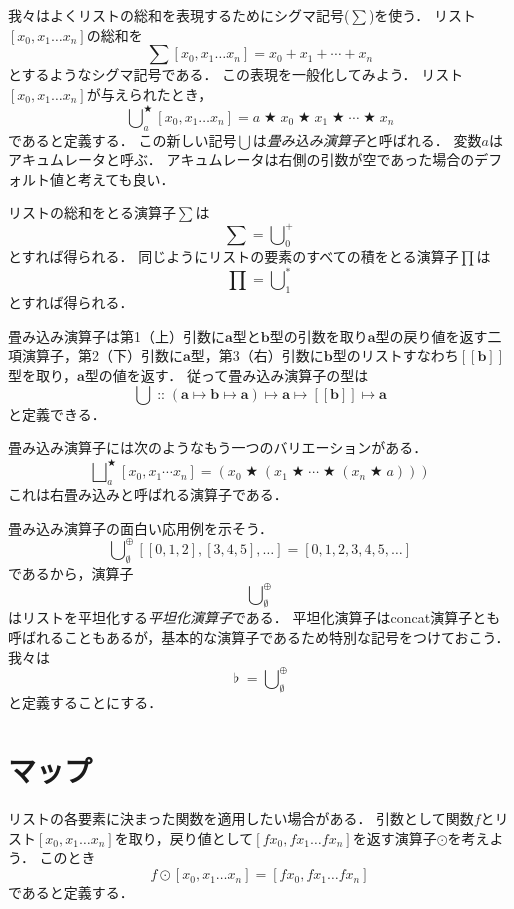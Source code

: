 \documentclass[twocolumn]{jsbook}
\def\[{[\![}
\def\]{]\!]}
\newcommand{\hsklType}[1]{\textbf{#1}}
\DeclareMathOperator{\hsklConcat}{\flat}
\newcommand{\hsklAppend}{\oplus}
\newcommand{\hsklEmptyList}{\emptyset}
\newcommand{\hsklMap}{\odot}
\newcommand{\hsklListType}[1]{\[#1\]}
\DeclareMathOperator{\mathAnyBinaryOperator}{\bigstar}
\DeclareMathOperator{\mathIn}{::}
\DeclareMathOperator*{\mathFold}{\bigcup}
\DeclareMathOperator*{\mathFoldRight}{\bigsqcup}
\DeclareMathOperator{\mathMapsTo}{\mapsto}
\newcommand{\mathMorphII}[3]{#1\mathMapsTo#2\mathMapsTo#3}
\newcommand{\mathMorphIII}[4]{#1\mathMapsTo#2\mathMapsTo#3\mathMapsTo#4}
\newcommand{\keyword}[1]{\emph{#1}}
\begin{document}
我々はよくリストの総和を表現するためにシグマ記号($\sum$)を使う．
リスト$[x_0,x_1\dots x_n]$の総和を$$\sum[x_0,x_1\dots x_n]=x_0+x_1+\dotsb+x_n$$とするようなシグマ記号である．
この表現を一般化してみよう．
リスト$[x_0,x_1\dots x_n]$が与えられたとき，$$\mathFold^{\mathAnyBinaryOperator}_{a}[x_0,x_1\dots x_n]=a\mathAnyBinaryOperator x_0\mathAnyBinaryOperator x_1\mathAnyBinaryOperator\dotsb\mathAnyBinaryOperator x_n$$であると定義する．
この新しい記号$\mathFold$は\keyword{畳み込み演算子}と呼ばれる．
変数$a$はアキュムレータと呼ぶ．
アキュムレータは右側の引数が空であった場合のデフォルト値と考えても良い．

リストの総和をとる演算子$\sum$は$$\sum=\mathFold^+_0$$とすれば得られる．
同じようにリストの要素のすべての積をとる演算子$\prod$は$$\prod=\mathFold^*_1$$とすれば得られる．

畳み込み演算子は第1（上）引数に$\hsklType{a}$型と$\hsklType{b}$型の引数を取り$\hsklType{a}$型の戻り値を返す二項演算子，第2（下）引数に$\hsklType{a}$型，第3（右）引数に$\hsklType{b}$型のリストすなわち$\hsklListType{\hsklType{b}}$型を取り，$\hsklType{a}$型の値を返す．
従って畳み込み演算子の型は$$\mathFold\mathIn\mathMorphIII{(\mathMorphII{\hsklType{a}}{\hsklType{b}}{\hsklType{a}})}{\hsklType{a}}{\hsklListType{\hsklType{b}}}{\hsklType{a}}$$と定義できる．

畳み込み演算子には次のようなもう一つのバリエーションがある．
$$\mathFoldRight^{\mathAnyBinaryOperator}_{a}[x_0,x_1\dotsb x_n]=\left(x_0\mathAnyBinaryOperator\left(x_1\mathAnyBinaryOperator\dotsb\mathAnyBinaryOperator\left(x_n\mathAnyBinaryOperator a\right)\right)\right)$$
これは右畳み込みと呼ばれる演算子である．

畳み込み演算子の面白い応用例を示そう．
$$\mathFold_\hsklEmptyList^\hsklAppend[[0,1,2],[3,4,5],\dots]=[0,1,2,3,4,5,\dots]$$
であるから，演算子$$\mathFold_\hsklEmptyList^\hsklAppend$$はリストを平坦化する\keyword{平坦化演算子}である．
平坦化演算子はconcat演算子とも呼ばれることもあるが，基本的な演算子であるため特別な記号をつけておこう．
我々は$$\hsklConcat=\mathFold_\hsklEmptyList^\hsklAppend$$と定義することにする．

\section{マップ}

リストの各要素に決まった関数を適用したい場合がある．
引数として関数$f$とリスト$[x_0,x_1\dots x_n]$を取り，戻り値として$[fx_0,fx_1\dots fx_n]$を返す演算子$\hsklMap$を考えよう．
このとき$$f\hsklMap[x_0,x_1\dots x_n]=[fx_0,fx_1\dots fx_n]$$であると定義する．
\end{document}
